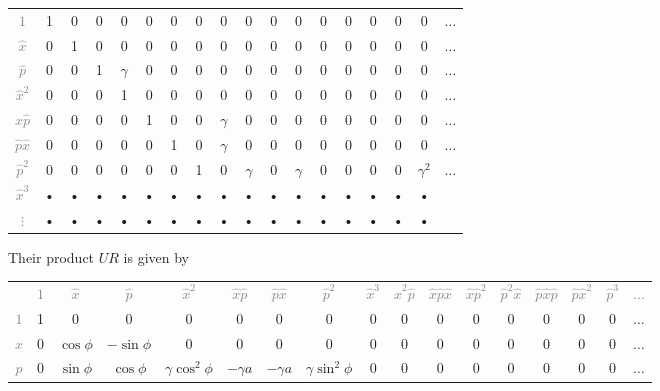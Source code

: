 \documentclass[aps,pra,10pt,onecolumn,notitlepage, groupedaddress,nofootinbib]{revtex4-1}
\theoremstyle{plain}
\begin{document}
{\begin{center}
\begin{tabular}{cccccccccccccccccc}
\textcolor{gray}{$1$} & 1 & 0 & 0 & 0 & 0 & 0 & 0 & 0 & 0 & 0 & 0 & 0 & 0& 0 & 0 & 0 & $\hdots$ \\
\textcolor{gray}{$\hat{x}$}  & 0 & 1 & 0 & 0 & 0 & 0 & 0 & 0 & 0 & 0 & 0 & 0& 0 & 0 & 0 & 0 & $\hdots$\\
\textcolor{gray}{$\hat{p}$}  & 0 & 0 & 1 & $\gamma$ & 0 & 0 & 0 & 0 & 0 & 0& 0 & 0 & 0 & 0 & 0 & 0 & $\hdots$\\
\textcolor{gray}{$\hat{x}^2$}  & 0 & 0 & 0 & 1 & 0 & 0 & 0 & 0 & 0 & 0 & 0 & 0& 0 & 0 & 0 & 0 & $\hdots$\\
\textcolor{gray}{$\hat{x}\hat{p}$}  & 0 & 0 & 0 & 0 & 1 & 0 & 0 & $\gamma$ & 0 & 0 & 0 & 0& 0 & 0 & 0 & 0 & $\hdots$\\
\textcolor{gray}{$\hat{p}\hat{x}$}  & 0 & 0 & 0 & 0 & 0 & 1 & 0 & $\gamma$ & 0 & 0 & 0 & 0& 0 & 0 & 0 & 0 & $\hdots$\\
\textcolor{gray}{$\hat{p}^2$}  & 0 & 0 & 0 & 0 & 0 & 0 & 1 & 0 & $\gamma$ & 0 & $\gamma$ & 0 & 0 & 0 & 0 & $\gamma^2$ & $\hdots$\\
\textcolor{gray}{$\hat{x}^3$} & • & • & • & • & • & • & • & • & • & • & • & • & • & •& • & • \\
\textcolor{gray}{$\vdots$} & • & • & • & • & • & • & • & • & • & • & • & • & • & • & •& • \\
\end{tabular}
\end{center}
Their product $UR$ is given by
\begin{center}
\def\arraystretch{1.5}
\footnotesize
\begin{tabular}{ccccccccccccccccc}
& \textcolor{gray}{$1$} & \textcolor{gray}{$\hat{x}$} & \textcolor{gray}{$\hat{p}$} & \textcolor{gray}{$\hat{x}^2$} & \textcolor{gray}{$\hat{x}\hat{p}$} & \textcolor{gray}{$\hat{p}\hat{x}$} & \textcolor{gray}{$\hat{p}^2$} & \textcolor{gray}{$\hat{x}^3$} & \textcolor{gray}{$\hat{x}^2\hat{p}$} & \textcolor{gray}{$\hat{x}\hat{p}\hat{x}$} & \textcolor{gray}{$\hat{x}\hat{p}^2$} &  \textcolor{gray}{$\hat{p}^2\hat{x}$} &  \textcolor{gray}{$\hat{p}\hat{x}\hat{p}$} &  \textcolor{gray}{$\hat{p}\hat{x}^2$} &  \textcolor{gray}{$\hat{p}^3$}  & \textcolor{gray}{$\hdots$} \\
\textcolor{gray}{$1$} & 1 & 0 & 0 & 0 & 0 & 0 & 0 & 0 & 0 & 0 & 0 & 0 & 0& 0 & 0 &  $\hdots$ \\
\textcolor{gray}{$\hat{x}$}  & 0 & $\cos \phi$ & $-\sin \phi$ & 0 & 0 & 0 & 0 & 0 & 0 & 0 & 0 & 0 & 0 & 0  & 0 & $\hdots$\\
\textcolor{gray}{$\hat{p}$}  & 0 & $\sin \phi$ & $ \cos \phi$ & $\gamma \cos^2 \phi$ & $-\gamma a$ & $-\gamma a$  & $\gamma\sin^2 \phi$ & 0 & 0 & 0 & 0 & 0 & 0 & 0 & 0 &  $\hdots$\\

\end{tabular}
\end{center}}
\end{document}
